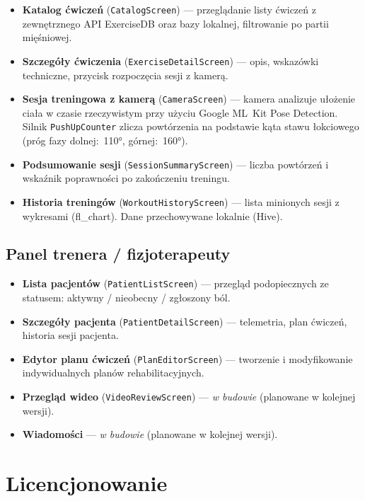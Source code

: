 \documentclass[12pt,a4paper]{article}
\begin{document}
\begin{itemize}
  \item \textbf{Katalog ćwiczeń} (\texttt{CatalogScreen}) --- przeglądanie listy ćwiczeń z zewnętrznego API ExerciseDB oraz bazy lokalnej, filtrowanie po partii mięśniowej.
  \item \textbf{Szczegóły ćwiczenia} (\texttt{ExerciseDetailScreen}) --- opis, wskazówki techniczne, przycisk rozpoczęcia sesji z kamerą.
  \item \textbf{Sesja treningowa z kamerą} (\texttt{CameraScreen}) --- kamera analizuje ułożenie ciała w czasie rzeczywistym przy użyciu Google ML~Kit Pose Detection. Silnik \texttt{PushUpCounter} zlicza powtórzenia na podstawie kąta stawu łokciowego (próg fazy dolnej:~110°, górnej:~160°).
  \item \textbf{Podsumowanie sesji} (\texttt{SessionSummaryScreen}) --- liczba powtórzeń i wskaźnik poprawności po zakończeniu treningu.
  \item \textbf{Historia treningów} (\texttt{WorkoutHistoryScreen}) --- lista minionych sesji z wykresami (fl\_chart). Dane przechowywane lokalnie (Hive).
\end{itemize}

\subsection{Panel trenera / fizjoterapeuty}

\begin{itemize}
  \item \textbf{Lista pacjentów} (\texttt{PatientListScreen}) --- przegląd podopiecznych ze statusem: aktywny / nieobecny / zgłoszony ból.
  \item \textbf{Szczegóły pacjenta} (\texttt{PatientDetailScreen}) --- telemetria, plan ćwiczeń, historia sesji pacjenta.
  \item \textbf{Edytor planu ćwiczeń} (\texttt{PlanEditorScreen}) --- tworzenie i modyfikowanie indywidualnych planów rehabilitacyjnych.
  \item \textbf{Przegląd wideo} (\texttt{VideoReviewScreen}) --- \textit{w budowie} (planowane w kolejnej wersji).
  \item \textbf{Wiadomości} --- \textit{w budowie} (planowane w kolejnej wersji).
\end{itemize}

\section{Licencjonowanie}
\end{document}
